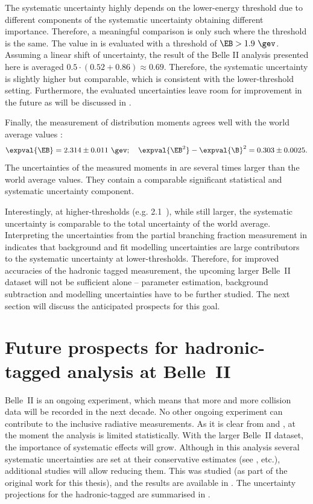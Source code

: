 The systematic uncertainty highly depends on the lower-\EB energy threshold due to different components of the systematic uncertainty obtaining different importance.
Therefore, a meaningful comparison is only such where the \EB threshold is the same.
The value in  is evaluated with a threshold of $\EB>1.9~\gev$.
Assuming a linear shift of uncertainty, the result of the Belle II analysis presented here is averaged $0.5\cdot(0.52+0.86)\approx0.69$.
Therefore, the systematic uncertainty is slightly higher but comparable, which is consistent with the lower-\EB threshold setting.
Furthermore, the evaluated uncertainties leave room for improvement in the future as will be discussed in .

Finally, the measurement of \EB distribution moments agrees well with the world average values \cite{Workman:2022ynf}:
\begin{equation}
    \expval{\EB} = 2.314 \pm 0.011 ~\gev; \quad \expval{\EB^2} - \expval{\B}^2 = 0.303 \pm 0.0025.
\end{equation}
The uncertainties of the measured moments in  are several times larger than the world average values.
They contain a comparable significant statistical and systematic uncertainty component.

Interestingly, at higher-\EB thresholds (e.g. 2.1~\gev), while still larger, the systematic uncertainty is comparable to the total uncertainty of the world average.
Interpreting the uncertainties from the partial branching fraction measurement in  indicates that background and fit modelling uncertainties are large contributors to the systematic uncertainty at lower-\EB thresholds.
Therefore, for improved accuracies of the hadronic tagged measurement,
the upcoming larger Belle~II dataset will not be sufficient alone --
parameter estimation, background subtraction and modelling uncertainties have to be further studied.
The next section will discuss the anticipated prospects for this goal.

\section{Future prospects for hadronic-tagged \safeBtoXsgamma analysis at Belle~II}\label{sec:future_prospects}

Belle~II is an ongoing experiment, which means that more and more \epem collision data will be recorded in the next decade.
No other ongoing experiment can contribute to the inclusive radiative measurements.
As it is clear from  and , at the moment the analysis is limited statistically.
With the larger Belle~II dataset, the importance of systematic effects will grow.
Although in this analysis several systematic uncertainties are set at their conservative estimates (see ,  etc.),
additional studies will allow reducing them.
This was studied (as part of the original work for this thesis), and the results are available in \cite{Belle-II:2022cgf}.
The uncertainty projections for the hadronic-tagged \BtoXsgamma are summarised in .

